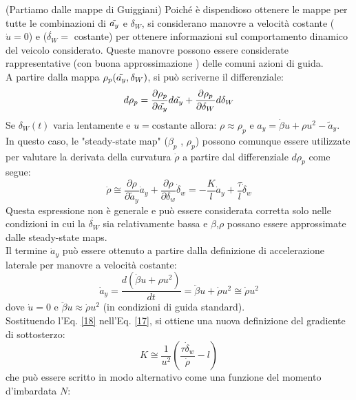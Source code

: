 (Partiamo dalle mappe di Guiggiani)
Poiché è dispendioso ottenere le mappe per tutte le combinazioni di $\Tilde{a_y}$ e $\delta_W$, si considerano manovre a velocità costante ($\dot{u} = 0$) e ($\dot{\delta_W} =$ costante) per ottenere informazioni sul comportamento dinamico del veicolo considerato. Queste manovre possono essere considerate rappresentative (con buona approssimazione ) delle comuni azioni di guida.\\
A partire dalla mappa $\rho_p(\Tilde{a_y}, \delta_W)$, si può scriverne il differenziale:
\begin{equation}
   d\rho_p = \frac{\partial \rho_p}{\partial \Tilde{a_y}} d\Tilde{a_y} + \frac{\partial \rho_p}{\partial \delta_W} d\delta_W 
\end{equation}
Se $\delta_W(t)$ varia lentamente e $u = \text{costante}$ allora: \quad $\rho \approx \rho_p$ \quad e \quad  $a_y = \dot{\beta}u + \rho u^2 - \tilde{a}_y$.\\ 
In questo caso, le "steady-state map" ($\beta_p$ , $\rho_p$) possono comunque essere utilizzate per valutare la derivata della curvatura $\dot{\rho}$ a partire dal differenziale $d\rho_p$ come segue:
\begin{equation} \label{17}
\dot{\rho} \cong \frac{\partial \rho}{\partial \tilde{a}_y} \dot{a}_y + \frac{\partial \rho}{\partial \delta_w} \dot{\delta}_w = - \frac{K}{l}\dot{a}_y + \frac{\tau}{l} \dot{\delta}_w
\end{equation}
Questa espressione non è generale e può essere considerata corretta solo nelle condizioni in cui la $\dot{\delta_W}$ sia relativamente bassa e $\beta$,$\rho$ possano essere approssimate dalle steady-state maps.\\
Il termine $\dot{a}_y$ può essere ottenuto a partire dalla definizione di accelerazione laterale per manovre a velocità costante:
\begin{equation} \label{18}
    \dot{a}_y = \frac{d(\dot{\beta}u + \rho u^2)}{dt} = \ddot{\beta}u + \dot{\rho}u^2 \cong \dot{\rho}u^2
\end{equation}
dove $\dot{u} = 0$   e  $\ddot{\beta}u \approx \dot{\rho}u^2$ (in condizioni di guida standard).\\ 
Sostituendo l'Eq. \ref{18} nell'Eq. \ref{17}, si ottiene una nuova definizione del gradiente di sottosterzo:
\begin{equation} \label{19}
    K \cong \frac{1}{u^2} \left( \frac{\tau \dot{\delta}_w }{\dot{\rho}} - l \right)    
\end{equation}
che può essere scritto in modo alternativo come una funzione del momento d'imbardata $N$:
